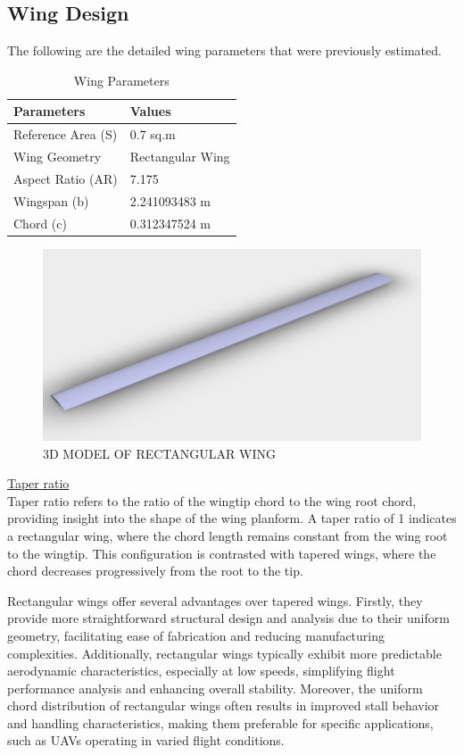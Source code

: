 \documentclass[12 pt]{article}
\begin{document}
{\subsection{Wing Design}
\color{black}
The following are the detailed wing parameters that were previously estimated.
\begin{table}[H]
\centering
\begin{tabular}{|l|l|}
\hline
\textbf{Parameters} & \textbf{Values} \\
\hline
Reference Area (S) & 0.7 sq.m \\
Wing Geometry & Rectangular Wing \\
Aspect Ratio (AR) & 7.175 \\
Wingspan (b) & 2.241093483 m \\
Chord (c) & 0.312347524 m \\
\hline
\end{tabular}
\caption{Wing Parameters}
\label{tab:wing_parameters}
\end{table}
\begin{figure}[H]
    \centering
    \includegraphics[width=1.0\linewidth]{3d_wing.png}
    \caption{3D MODEL OF RECTANGULAR WING}
    \label{3D MODEL OF RECTANGULAR WING}
    \end{figure}

 \large{\underline{Taper ratio}}
\color{black}
\vspace{5mm}
\\Taper ratio refers to the ratio of the wingtip chord to the wing root chord, providing insight into the shape of the wing planform. A taper ratio of 1 indicates a rectangular wing, where the chord length remains constant from the wing root to the wingtip. This configuration is contrasted with tapered wings, where the chord decreases progressively from the root to the tip.

Rectangular wings offer several advantages over tapered wings. Firstly, they provide more straightforward structural design and analysis due to their uniform geometry, facilitating ease of fabrication and reducing manufacturing complexities. Additionally, rectangular wings typically exhibit more predictable aerodynamic characteristics, especially at low speeds, simplifying flight performance analysis and enhancing overall stability. Moreover, the uniform chord distribution of rectangular wings often results in improved stall behavior and handling characteristics, making them preferable for specific applications, such as UAVs operating in varied flight conditions.

}
\end{document}
